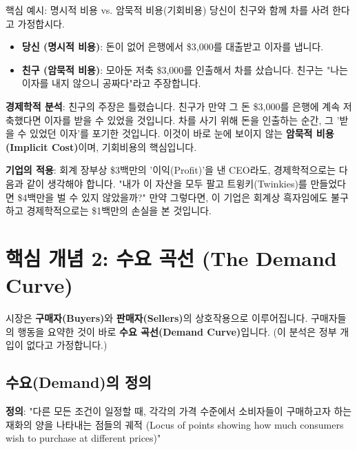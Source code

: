 \documentclass[11pt,a4paper]{article}
\theoremstyle{definition}
\begin{document}
\begin{keypointbox}{핵심 예시: 명시적 비용 vs. 암묵적 비용(기회비용)}
    당신이 친구와 함께 차를 사려 한다고 가정합시다.

    \begin{itemize}
        \item \textbf{당신 (명시적 비용)}: 돈이 없어 은행에서 \$3,000를 대출받고 이자를 냅니다.
        \item \textbf{친구 (암묵적 비용)}: 모아둔 저축 \$3,000를 인출해서 차를 샀습니다. 친구는 "나는 이자를 내지 않으니 공짜다"라고 주장합니다.
    \end{itemize}

    \textbf{경제학적 분석}: 친구의 주장은 틀렸습니다.
    친구가 만약 그 돈 \$3,000를 은행에 계속 저축했다면 이자를 받을 수 있었을 것입니다.
    차를 사기 위해 돈을 인출하는 순간, 그 '받을 수 있었던 이자'를 포기한 것입니다.
    이것이 바로 눈에 보이지 않는 \textbf{암묵적 비용(Implicit Cost)}이며, 기회비용의 핵심입니다.

    \textbf{기업의 적용}: 회계 장부상 \$3백만의 '이익(Profit)'을 낸 CEO라도, 경제학적으로는 다음과 같이 생각해야 합니다. "내가 이 자산을 모두 팔고 트윙키(Twinkies)를 만들었다면 \$4백만을 벌 수 있지 않았을까?" 만약 그렇다면, 이 기업은 회계상 흑자임에도 불구하고 경제학적으로는 \$1백만의 손실을 본 것입니다.
\end{keypointbox}


\newpage

\section{핵심 개념 2: 수요 곡선 (The Demand Curve)}

시장은 \textbf{구매자(Buyers)}와 \textbf{판매자(Sellers)}의 상호작용으로 이루어집니다.
구매자들의 행동을 요약한 것이 바로 \textbf{수요 곡선(Demand Curve)}입니다. (이 분석은 정부 개입이 없다고 가정합니다.)

\subsection{수요(Demand)의 정의}

\textbf{정의}: "다른 모든 조건이 일정할 때, 각각의 가격 수준에서 소비자들이 구매하고자 하는 재화의 양을 나타내는 점들의 궤적 (Locus of points showing how much consumers wish to purchase at different prices)"
\end{document}
